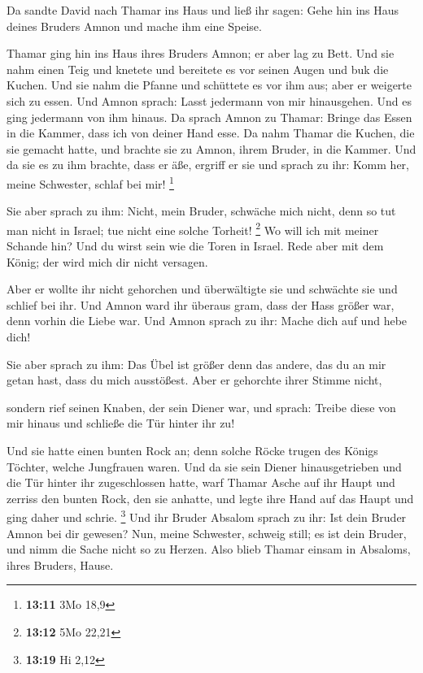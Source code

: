  Da sandte David nach Thamar ins Haus und ließ ihr sagen:
Gehe hin ins Haus deines Bruders Amnon und mache ihm eine Speise.

 Thamar ging hin ins Haus ihres Bruders Amnon; er aber lag
zu Bett. Und sie nahm einen Teig und knetete und bereitete es vor seinen
Augen und buk die Kuchen.  Und sie nahm die Pfanne und
schüttete es vor ihm aus; aber er weigerte sich zu essen. Und Amnon
sprach: Lasst jedermann von mir hinausgehen. Und es ging jedermann von
ihm hinaus.  Da sprach Amnon zu Thamar: Bringe das Essen
in die Kammer, dass ich von deiner Hand esse. Da nahm Thamar die Kuchen,
die sie gemacht hatte, und brachte sie zu Amnon, ihrem Bruder, in die
Kammer.  Und da sie es zu ihm brachte, dass er äße,
ergriff er sie und sprach zu ihr: Komm her, meine Schwester, schlaf bei
mir! \footnote{\textbf{13:11} 3Mo 18,9}

 Sie aber sprach zu ihm: Nicht, mein Bruder, schwäche
mich nicht, denn so tut man nicht in Israel; tue nicht eine solche
Torheit! \footnote{\textbf{13:12} 5Mo 22,21}  Wo will ich
mit meiner Schande hin? Und du wirst sein wie die Toren in Israel. Rede
aber mit dem König; der wird mich dir nicht versagen.

 Aber er wollte ihr nicht gehorchen und überwältigte sie
und schwächte sie und schlief bei ihr.  Und Amnon ward
ihr überaus gram, dass der Hass größer war, denn vorhin die Liebe war.
Und Amnon sprach zu ihr: Mache dich auf und hebe dich!

 Sie aber sprach zu ihm: Das Übel ist größer denn das
andere, das du an mir getan hast, dass du mich ausstößest. Aber er
gehorchte ihrer Stimme nicht,

 sondern rief seinen Knaben, der sein Diener war, und
sprach: Treibe diese von mir hinaus und schließe die Tür hinter ihr zu!

 Und sie hatte einen bunten Rock an; denn solche Röcke
trugen des Königs Töchter, welche Jungfrauen waren. Und da sie sein
Diener hinausgetrieben und die Tür hinter ihr zugeschlossen hatte,
 warf Thamar Asche auf ihr Haupt und zerriss den bunten
Rock, den sie anhatte, und legte ihre Hand auf das Haupt und ging daher
und schrie. \footnote{\textbf{13:19} Hi 2,12}  Und ihr
Bruder Absalom sprach zu ihr: Ist dein Bruder Amnon bei dir gewesen?
Nun, meine Schwester, schweig still; es ist dein Bruder, und nimm die
Sache nicht so zu Herzen. Also blieb Thamar einsam in Absaloms, ihres
Bruders, Hause.

